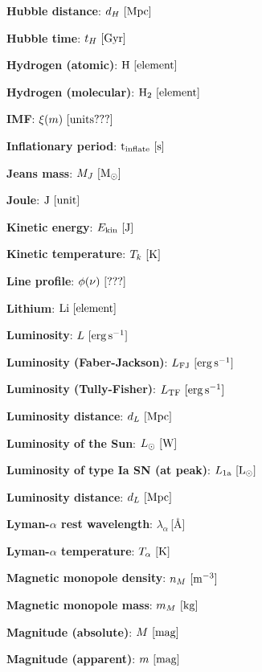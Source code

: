 \documentclass[a4paper,11pt]{article}
\begin{document}
{\noindent}\textbf{Hubble distance}: $d_H ~ [{\rm Mpc}]$

{\noindent}\textbf{Hubble time}: $t_H ~ [{\rm Gyr}]$

{\noindent}\textbf{Hydrogen (atomic)}: ${\rm H} ~ [{\rm element}]$

{\noindent}\textbf{Hydrogen (molecular)}: ${\rm H_2} ~ [{\rm element}]$

{\noindent}\textbf{IMF}: $\xi(m) ~ [{\rm units???}]$

{\noindent}\textbf{Inflationary period}: ${\rm t_\mathrm{inflate}} ~ [{\rm s}]$

{\noindent}\textbf{Jeans mass}: $M_J ~ [{\rm M_\odot}]$

{\noindent}\textbf{Joule}: ${\rm J} ~ [{\rm unit}]$

{\noindent}\textbf{Kinetic energy}: $E_\mathrm{kin} ~ [{\rm J}]$

{\noindent}\textbf{Kinetic temperature}: $T_k ~ [{\rm K}]$

{\noindent}\textbf{Line profile}: $\phi(\nu) ~ [{\rm ???}]$

{\noindent}\textbf{Lithium}: ${\rm Li} ~ [{\rm element}]$

{\noindent}\textbf{Luminosity}: $L ~ [{\rm erg\,s^{-1}}]$

{\noindent}\textbf{Luminosity (Faber-Jackson)}: $L_\mathrm{FJ} ~ [{\rm erg\,s^{-1}}]$

{\noindent}\textbf{Luminosity (Tully-Fisher)}: $L_\mathrm{TF} ~ [{\rm erg\,s^{-1}}]$

{\noindent}\textbf{Luminosity distance}: $d_L ~ [{\rm Mpc}]$

{\noindent}\textbf{Luminosity of the Sun}: $L_\odot ~ [{\rm W}]$

{\noindent}\textbf{Luminosity of type Ia SN (at peak)}: $L_\mathrm{1a} ~ [{\rm L_\odot}]$

{\noindent}\textbf{Luminosity distance}: $d_L ~ [{\rm Mpc}]$

{\noindent}\textbf{Lyman-$\alpha$ rest wavelength}: $\lambda_\alpha$\,[\AA]

{\noindent}\textbf{Lyman-$\alpha$ temperature}: $T_\alpha ~ [{\rm K}]$

{\noindent}\textbf{Magnetic monopole density}: $n_M ~ [{\rm m^{-3}}]$

{\noindent}\textbf{Magnetic monopole mass}: $m_M ~ [{\rm kg}]$

{\noindent}\textbf{Magnitude (absolute)}: $M ~ [{\rm mag}]$

{\noindent}\textbf{Magnitude (apparent)}: $m ~ [{\rm mag}]$
\end{document}
